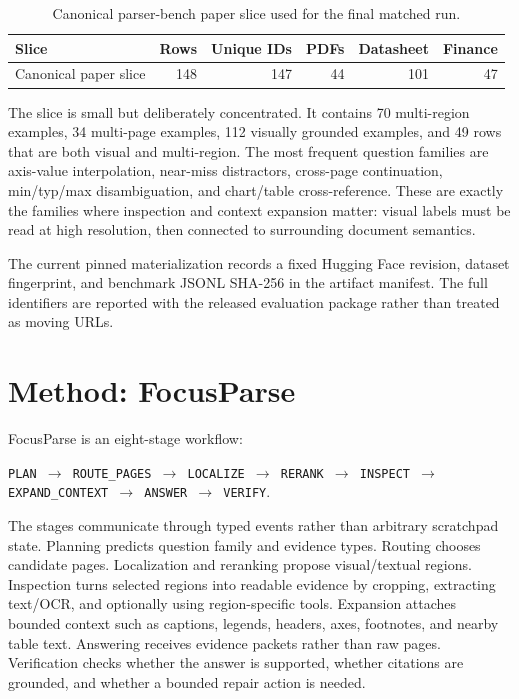 \documentclass[10pt]{article}
\begin{document}
\begin{table}[t]
\centering
\caption{Canonical parser-bench paper slice used for the final matched run.}
\label{tab:dataset}
\begin{tabular}{lrrrrr}
\toprule
Slice & Rows & Unique IDs & PDFs & Datasheet & Finance \\
\midrule
Canonical paper slice & 148 & 147 & 44 & 101 & 47 \\
\bottomrule
\end{tabular}
\end{table}

The slice is small but deliberately concentrated. It contains 70 multi-region
examples, 34 multi-page examples, 112 visually grounded examples, and 49 rows
that are both visual and multi-region. The most frequent question families are
axis-value interpolation, near-miss distractors, cross-page continuation,
min/typ/max disambiguation, and chart/table cross-reference. These are exactly
the families where inspection and context expansion matter: visual labels must
be read at high resolution, then connected to surrounding document semantics.

The current pinned materialization records a fixed Hugging Face revision,
dataset fingerprint, and benchmark JSONL SHA-256 in the artifact manifest. The
full identifiers are reported with the released evaluation package rather than
treated as moving URLs.

\section{Method: FocusParse}

FocusParse is an eight-stage workflow:
\begin{center}
\texttt{PLAN $\rightarrow$ ROUTE\_PAGES $\rightarrow$ LOCALIZE $\rightarrow$ RERANK $\rightarrow$ INSPECT $\rightarrow$ EXPAND\_CONTEXT $\rightarrow$ ANSWER $\rightarrow$ VERIFY}.
\end{center}
The stages communicate through typed events rather than arbitrary scratchpad
state. Planning predicts question family and evidence types. Routing chooses
candidate pages. Localization and reranking propose visual/textual regions.
Inspection turns selected regions into readable evidence by cropping,
extracting text/OCR, and optionally using region-specific tools. Expansion
attaches bounded context such as captions, legends, headers, axes, footnotes,
and nearby table text. Answering receives evidence packets rather than raw
pages. Verification checks whether the answer is supported, whether citations
are grounded, and whether a bounded repair action is needed.
\end{document}
